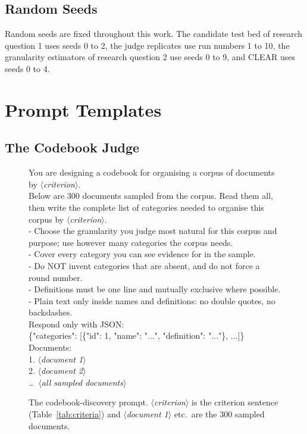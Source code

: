 \documentclass[11pt,a4paper,oneside]{report}
\newcommand{\ph}[1]{\textcolor{blue!60!black}{\rmfamily\itshape $\langle$#1$\rangle$}}
\begin{document}
\FloatBarrier

\section{Random Seeds}\label{app:seeds}

Random seeds are fixed throughout this work. The candidate test bed of research question 1 uses seeds 0 to 2, the judge replicates use run numbers 1 to 10, the granularity estimators of research question 2 use seeds 0 to 9, and CLEAR uses seeds 0 to 4.

\clearpage
\chapter{Prompt Templates}\label{app:prompts}

\section{The Codebook Judge}\label{app:prompts-judge}

\begin{figure}[htbp]
\begin{promptbox}
\small\ttfamily
You are designing a codebook for organising a corpus of documents by \ph{criterion}.\\[4pt]
Below are 300 documents sampled from the corpus. Read them all, then write the complete list of categories needed to organise this corpus by \ph{criterion}.\\
- Choose the granularity you judge most natural for this corpus and purpose; use however many categories the corpus needs.\\
- Cover every category you can see evidence for in the sample.\\
- Do NOT invent categories that are absent, and do not force a round number.\\
- Definitions must be one line and mutually exclusive where possible.\\
- Plain text only inside names and definitions: no double quotes, no backslashes.\\[4pt]
Respond only with JSON:\\
\{"categories": [\{"id": 1, "name": "...", "definition": "..."\}, ...]\}\\[4pt]
Documents:\\
1. \ph{document 1}\\
2. \ph{document 2}\\
\ldots\ \ph{all sampled documents}
\end{promptbox}
\caption[Codebook-discovery prompt]{The codebook-discovery prompt. \ph{criterion} is the criterion sentence (Table~\ref{tab:criteria}) and \ph{document 1} etc.\ are the 300 sampled documents.}
\label{fig:prompt-codebook}
\end{figure}
\end{document}
